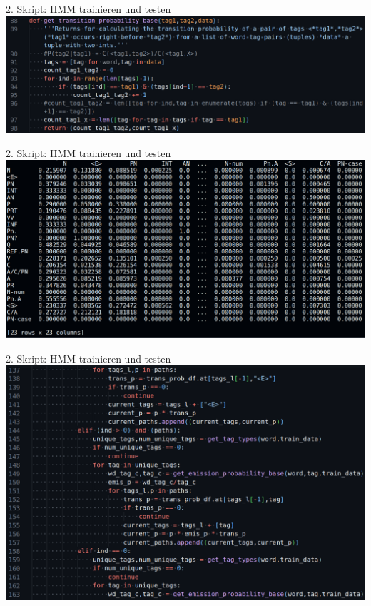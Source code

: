 \documentclass{beamer}
\begin{document}
\begin{frame}[t]{2. Skript: HMM trainieren und testen}
	\includegraphics[scale=0.43]{"./pics/hmm_script_pics/08.png"}
\end{frame}

\begin{frame}[t]{2. Skript: HMM trainieren und testen}
	\includegraphics[scale=0.43]{"./pics/hmm_script_pics/16.png"}
\end{frame}

\begin{frame}[t]{2. Skript: HMM trainieren und testen}
	\includegraphics[scale=0.43]{"./pics/hmm_script_pics/11.png"}
\end{frame}
\end{document}
